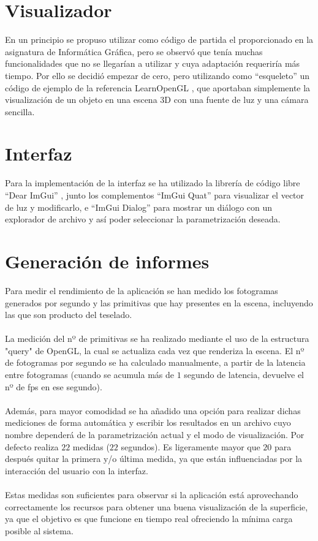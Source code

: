 \section*{Visualizador}
En un principio se propuso utilizar como código de partida el proporcionado en la asignatura de Informática Gráfica, pero se observó que tenía muchas funcionalidades que no se llegarían a utilizar y cuya adaptación requeriría más tiempo. Por ello se decidió empezar de cero, pero utilizando como ``esqueleto'' un código de ejemplo de la referencia LearnOpenGL \cite{LearnOGL}, que aportaban simplemente la visualización de un objeto en una escena $3$D con una fuente de luz y una cámara sencilla.

\section*{Interfaz}
Para la implementación de la interfaz se ha utilizado la librería de código libre ``Dear ImGui'' \cite{DearImGui}, junto los complementos ``ImGui Quat'' \cite{LVector} para visualizar el vector de luz y modificarlo, e ``ImGui Dialog'' \cite{Dialog} para mostrar un diálogo con un explorador de archivo y así poder seleccionar la parametrización deseada.

\section*{Generación de informes}

	Para medir el rendimiento de la aplicación se han medido los fotogramas generados por segundo y las primitivas que hay presentes en la escena, incluyendo las que son producto del teselado.\\
\\La medición del nº de primitivas se ha realizado mediante el uso de la estructura "query" de OpenGL, la cual se actualiza cada vez que renderiza la escena. El nº de fotogramas por segundo se ha calculado manualmente, a partir de la latencia entre fotogramas (cuando se acumula más de $1$ segundo de latencia, devuelve el nº de fps en ese segundo).\\
\\Además, para mayor comodidad se ha añadido una opción para realizar dichas mediciones de forma automática y escribir los resultados en un archivo cuyo nombre dependerá de la parametrización actual y el modo de visualización. Por defecto realiza $22$ medidas ($22$ segundos). Es ligeramente mayor que $20$ para después quitar la primera y/o última medida, ya que están influenciadas por la interacción del usuario con la interfaz.\\
\\Estas medidas son suficientes para observar si la aplicación está aprovechando correctamente los recursos para obtener una buena visualización de la superficie, ya que el objetivo es que funcione en tiempo real ofreciendo la mínima carga posible al sistema.

